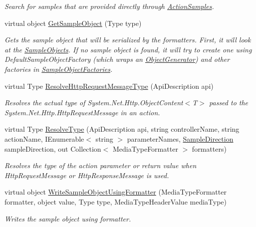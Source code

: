 \begin{DoxyCompactItemize}
\begin{DoxyCompactList}\small\item\em Search for samples that are provided directly through \hyperlink{class_w_s1aarsproeve_1_1_areas_1_1_help_page_1_1_help_page_sample_generator_a2555dfa02ad5bcbfde218b929232c890}{Action\+Samples}. \end{DoxyCompactList}\item 
virtual object \hyperlink{class_w_s1aarsproeve_1_1_areas_1_1_help_page_1_1_help_page_sample_generator_aa6d7ce84b445586e5919d3c07a2ccc11}{Get\+Sample\+Object} (Type type)
\begin{DoxyCompactList}\small\item\em Gets the sample object that will be serialized by the formatters. First, it will look at the \hyperlink{class_w_s1aarsproeve_1_1_areas_1_1_help_page_1_1_help_page_sample_generator_a64ab17da769ced26a1908d1e48d5f9d0}{Sample\+Objects}. If no sample object is found, it will try to create one using Default\+Sample\+Object\+Factory (which wraps an \hyperlink{class_w_s1aarsproeve_1_1_areas_1_1_help_page_1_1_object_generator}{Object\+Generator}) and other factories in \hyperlink{class_w_s1aarsproeve_1_1_areas_1_1_help_page_1_1_help_page_sample_generator_aca3950f9dbe43316aa63aeaaeb1b05b1}{Sample\+Object\+Factories}. \end{DoxyCompactList}\item 
virtual Type \hyperlink{class_w_s1aarsproeve_1_1_areas_1_1_help_page_1_1_help_page_sample_generator_a3e37a9bba4063a2746c85965e29fd043}{Resolve\+Http\+Request\+Message\+Type} (Api\+Description api)
\begin{DoxyCompactList}\small\item\em Resolves the actual type of System.\+Net.\+Http.\+Object\+Content$<$\+T$>$ passed to the System.\+Net.\+Http.\+Http\+Request\+Message in an action. \end{DoxyCompactList}\item 
virtual Type \hyperlink{class_w_s1aarsproeve_1_1_areas_1_1_help_page_1_1_help_page_sample_generator_a9aeb8a00aaefa5872208f28a6c6f8cd2}{Resolve\+Type} (Api\+Description api, string controller\+Name, string action\+Name, I\+Enumerable$<$ string $>$ parameter\+Names, \hyperlink{namespace_w_s1aarsproeve_1_1_areas_1_1_help_page_a68a9a343f44949e9781196ca9699289c}{Sample\+Direction} sample\+Direction, out Collection$<$ Media\+Type\+Formatter $>$ formatters)
\begin{DoxyCompactList}\small\item\em Resolves the type of the action parameter or return value when Http\+Request\+Message or Http\+Response\+Message is used. \end{DoxyCompactList}\item 
virtual object \hyperlink{class_w_s1aarsproeve_1_1_areas_1_1_help_page_1_1_help_page_sample_generator_a40dd88815ced7cefa28aa3c247084c74}{Write\+Sample\+Object\+Using\+Formatter} (Media\+Type\+Formatter formatter, object value, Type type, Media\+Type\+Header\+Value media\+Type)
\begin{DoxyCompactList}\small\item\em Writes the sample object using formatter. \end{DoxyCompactList}\end{DoxyCompactItemize}

